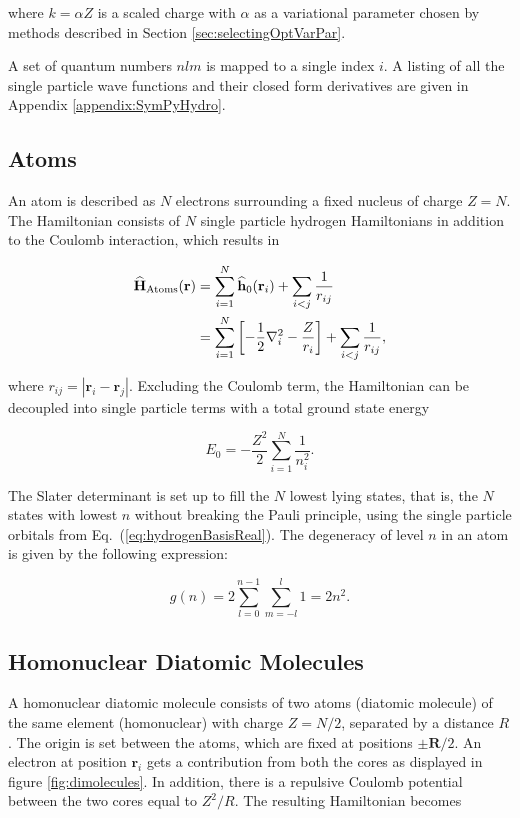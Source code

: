 where $k = \alpha Z$ is a scaled charge with $\alpha$ as a variational parameter chosen by methods described in Section \ref{sec:selectingOptVarPar}.

A set of quantum numbers $nlm$ is mapped to a single index $i$. A listing of all the single particle wave functions and their closed form derivatives are given in Appendix \ref{appendix:SymPyHydro}.

\subsection{Atoms}

An atom is described as $N$ electrons surrounding a fixed nucleus of charge $Z=N$. The Hamiltonian consists of $N$ single particle hydrogen Hamiltonians in addition to the Coulomb interaction, which results in

\begin{align}
 {\bf\widehat{H}}_{\mathrm{Atoms}}(\mathbf{r}) &= \sum_{i=1}^N {\bf\widehat{h}}_0(\mathbf{r}_i) + \sum_{i<j} \frac{1}{r_{ij}} \\
                         &= \sum_{i=1}^N \left[-\frac{1}{2}\nabla_i^2 - \frac{Z}{r_i}\right] + \sum_{i<j} \frac{1}{r_{ij}},
\end{align}

where $r_{ij} = |\mathbf{r}_i -\mathbf{r}_j|$. Excluding the Coulomb term, the Hamiltonian can be decoupled into single particle terms with a total ground state energy

\begin{equation}
 E_0 = -\frac{Z^2}{2}\sum_{i=1}^N \frac{1}{n_i^2}. \label{eq:atomsE0}
\end{equation}

The Slater determinant is set up to fill the $N$ lowest lying states, that is, the $N$ states with lowest $n$ without breaking the Pauli principle, using the single particle orbitals from Eq.~(\ref{eq:hydrogenBasisReal}). The degeneracy of level $n$ in an atom is given by the following expression:

\begin{equation}
g(n) = 2\sum_{l=0}^{n-1}\sum_{m={-l}}^l 1 = 2n^2. 
\end{equation}

\subsection{Homonuclear Diatomic Molecules}

A homonuclear diatomic molecule consists of two atoms (diatomic molecule) of the same element (homonuclear) with charge $Z=N/2$, separated by a distance $R$. The origin is set between the atoms, which are fixed at positions $\pm \mathbf{R}/2$. An electron at position $\mathbf{r}_i$ gets a contribution from both the cores as displayed in figure \ref{fig:dimolecules}. In addition, there is a repulsive Coulomb potential between the two cores equal to $Z^2/R$. The resulting Hamiltonian becomes

